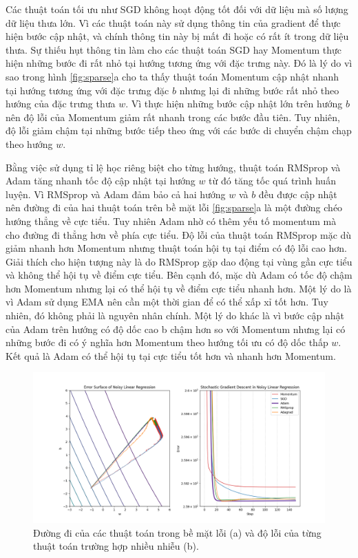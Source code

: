 Các thuật toán tối ưu như SGD không hoạt động tốt đối với dữ liệu mà số lượng dữ liệu thưa lớn. Vì các thuật toán này sử dụng thông tin của gradient để thực hiện bước cập nhật, và chính thông tin này bị mất đi hoặc có rất ít trong dữ liệu thưa. Sự thiếu hụt thông tin làm cho các thuật toán SGD hay Momentum thực hiện những bước đi rất nhỏ tại hướng tương ứng với đặc trưng này. Đó là lý do vì sao trong hình \ref{fig:sparse}a cho ta thấy thuật toán Momentum cập nhật nhanh tại hướng tương ứng với đặc trưng đặc $b$ nhưng lại đi những bước rất nhỏ theo hướng của đặc trưng thưa $w$. Vì thực hiện những bước cập nhật lớn trên hướng $b$ nên độ lỗi của Momentum giảm rất nhanh trong các bước đầu tiên. Tuy nhiên, độ lỗi giảm chậm tại những bước tiếp theo ứng với các bước di chuyển chậm chạp theo hướng $w$.

Bằng việc sử dụng tỉ lệ học riêng biệt cho từng hướng, thuật toán RMSprop và Adam tăng nhanh tốc độ cập nhật tại hướng $w$ từ đó tăng tốc quá trình huấn luyện. Vì RMSprop và Adam đảm bảo cả hai hướng $w$ và $b$ đều được cập nhật nên đường đi của hai thuật toán trên bề mặt lỗi \ref{fig:sparse}a là một đường chéo hướng thẳng về cực tiểu. Tuy nhiên Adam nhờ có thêm yếu tố momentum mà cho đường đi thẳng hơn về phía cực tiểu. Độ lỗi của thuật toán RMSprop mặc dù giảm nhanh hơn Momentum nhưng thuật toán hội tụ tại điểm có độ lỗi cao hơn. Giải thích cho hiện tượng này là do RMSprop gặp dao động tại vùng gần cực tiểu và không thể hội tụ về điểm cực tiểu. Bên cạnh đó, mặc dù Adam có tốc độ chậm hơn Momentum nhưng lại có thể hội tụ về điểm cực tiểu nhanh hơn. Một lý do là vì Adam sử dụng EMA nên cần một thời gian để có thể xấp xỉ tốt hơn. Tuy nhiên, đó không phải là nguyên nhân chính. Một lý do khác là vì bước cập nhật của Adam trên hướng có độ dốc cao b chậm hơn so với Momentum nhưng lại có những bước đi có ý nghĩa hơn Momentum theo hướng tối ưu có độ dốc thấp $w$. Kết quả là Adam có thể hội tụ tại cực tiểu tốt hơn và nhanh hơn Momentum.

\begin{figure}[htp]
	\centering
	\includegraphics[width=140 mm]{images/noise.png}
	\caption{Đường đi của các thuật toán trong bề mặt lỗi (a) và độ lỗi của từng thuật toán trường hợp nhiều nhiễu (b).}
	\label{fig:noise}
\end{figure}

